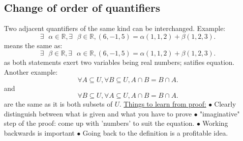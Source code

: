 \documentclass{article}
\begin{document}
\subsection{Change of order of quantifiers}
Two adjacent quantifiers of the same kind can be interchanged. Example:
$$\exists \text{ } \alpha \in \mathbb{R}, \exists \text{ } \beta \in \mathbb{R}, (6, -1, 5) = \alpha(1, 1, 2) + \beta(1, 2, 3).$$
means the same as:
$$\exists \text{ } \beta \in \mathbb{R}, \exists \text{ } \alpha \in \mathbb{R}, (6, -1, 5) = \alpha(1, 1, 2) + \beta(1, 2, 3).$$
as both statements exert two variables being real numbers; satifies equation. 
\newline
\newline
Another example:
$$\forall A \subseteq U , \forall B \subseteq U, A \cap B = B \cap A.$$
and
$$\forall B \subseteq U , \forall A \subseteq U, A \cap B = B \cap A.$$
are the same as it is both subsets of $U$.
\newline
\newline
{}
\newline
{}
\newline
\newline
\underline{Things to learn from proof:}
\newline
$\bullet $ Clearly distinguish between what is given and what you have to prove
\newline
$\bullet $ "imaginative" step of the proof: come up with 'numbers' to suit the equation. 
\newline
$\bullet $ Working backwards is important
\newline
$\bullet $ Going back to the definition is a profitable idea.
\newpage
\end{document}
